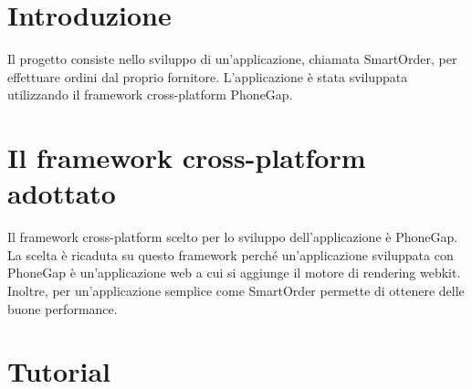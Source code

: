 \documentclass[12pt, a4paper, titlepage]{report}
\begin{document}
	
	\begin{frontespizio}
		\begin{Preambolo*}
			\usepackage{fourier}
		\end{Preambolo*}
	\end{frontespizio}
	
	\setcounter{page}{2}
	\tableofcontents
	\newpage
	\listoffigures
	\newpage
	\listoftables
	\setcounter{table}{0}
	\newpage	    
	\renewcommand*{\arraystretch}{2}
	\pagestyle{fancy}
	\fancyhf{}
	\cfoot{\thepage}
	
	\section{Introduzione}
	Il progetto consiste nello sviluppo di un'applicazione, chiamata SmartOrder, per effettuare ordini dal proprio fornitore. L'applicazione è stata sviluppata utilizzando il framework cross-platform PhoneGap.
	
	\section{Il framework cross-platform adottato}
	Il framework cross-platform scelto per lo sviluppo dell'applicazione è PhoneGap. La scelta è ricaduta su questo framework perché un'applicazione sviluppata con PhoneGap è un'applicazione web a cui si aggiunge il motore di rendering webkit. Inoltre, per un'applicazione semplice come SmartOrder permette di ottenere delle buone performance.
	
	\section{Tutorial}
	
\end{document}
